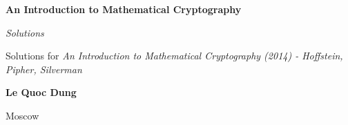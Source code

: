 \begin{titlepage}
   \begin{center}
        \vspace*{1cm}
        \huge
        \textbf{An Introduction to Mathematical Cryptography}

        \vspace{0.5cm}
        \textit{Solutions}
            
        \vspace{1.5cm}
        \large 
         Solutions for \textit{An Introduction to Mathematical Cryptography (2014) - Hoffstein, Pipher, Silverman} 
            
        \vspace{0.8cm}
        
        \textbf{Le Quoc Dung}
        
        \vspace{1cm}
        
        \vfill
        
        Moscow
            
   \end{center}
\end{titlepage}